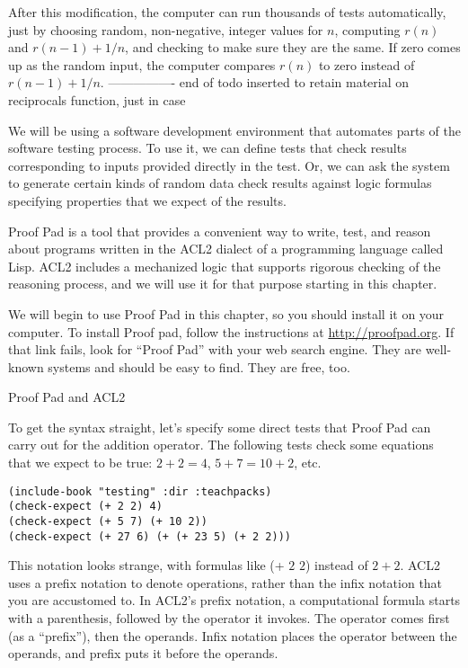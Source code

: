 {After this modification, the computer can run thousands of tests automatically,
just by choosing random, non-negative, integer values for $n$,
computing $r(n)$ and $r(n-1) + 1/n$,
and checking to make sure they are the same.
If zero comes up as the random input,
the computer compares $r(n)$ to zero instead of
$r(n-1) + 1/n$.
---------------- end of todo inserted to retain material on reciprocals function, just in case}

We will be using a software development environment that automates parts of the software testing process.
To use it, we can define tests that check results corresponding to inputs provided directly in the test.
Or, we can ask the system to generate certain kinds of random data check results
against logic formulas specifying properties that we expect of the results.

\begin{aside}
Proof Pad is a tool that provides a convenient way
to write, test, and reason about programs
written in the ACL2 dialect of a programming language called Lisp.
ACL2 includes a mechanized logic that
supports rigorous checking of the reasoning process,
and we will use it for that purpose starting in this chapter.

We will begin to use Proof Pad in this chapter,
so you should install it on your computer.
To install Proof pad, follow the instructions at \url{http://proofpad.org}.
If that link fails, look for ``Proof Pad''
with your web search engine.
They are well-known systems and should be easy to find.
They are free, too.
\label{aside:proof-pad}
\caption{Proof Pad and ACL2}
\end{aside}

To get the syntax straight, let's specify some direct tests that Proof Pad
can carry out for the addition operator.
The following tests check some equations that we expect to be true: 
$2 + 2 = 4$, $5 + 7 = 10 + 2$, etc.

\begin{Verbatim}
(include-book "testing" :dir :teachpacks)
(check-expect (+ 2 2) 4)
(check-expect (+ 5 7) (+ 10 2))
(check-expect (+ 27 6) (+ (+ 23 5) (+ 2 2)))
\end{Verbatim}

This notation looks strange, with formulas like (+ $2$ $2$) instead of $2 + 2$.
ACL2 uses a prefix notation to denote operations, rather than the infix notation
that you are accustomed to.
In ACL2's prefix notation, a computational formula starts with a parenthesis,
followed by the operator it invokes. 
The operator comes first (as a ``prefix''), then the operands.
Infix notation places the operator between the operands,
and prefix puts it before the operands.

